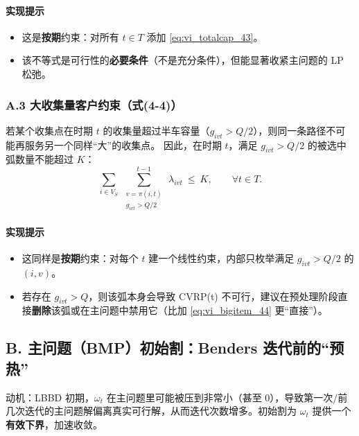\documentclass{article}
\begin{document}
\paragraph{实现提示}
\begin{itemize}[leftmargin=2em]
  \item 这是\textbf{按期}约束：对所有 $t\in T$ 添加 \eqref{eq:vi_totalcap_43}。
  \item 该不等式是可行性的\textbf{必要条件}（不是充分条件），但能显著收紧主问题的 LP 松弛。
\end{itemize}

\subsubsection*{A.3 大收集量客户约束（式(4-4)）}

若某个收集点在时期 $t$ 的收集量超过半车容量（$g_{ivt}>Q/2$），则同一条路径不可能再服务另一个同样“大”的收集点。
因此，在时期 $t$，满足 $g_{ivt}>Q/2$ 的被选中弧数量不能超过 $K$：
\begin{equation}
\sum_{i\in V_S}\ \sum_{\substack{v=\pi(i,t)\\ g_{ivt}>Q/2}}^{t-1}\ \lambda_{ivt}\ \le\ K,\qquad \forall t\in T.
\label{eq:vi_bigitem_44}
\end{equation}

\paragraph{实现提示}
\begin{itemize}[leftmargin=2em]
  \item 这同样是\textbf{按期}约束：对每个 $t$ 建一个线性约束，内部只枚举满足 $g_{ivt}>Q/2$ 的 $(i,v)$。
  \item 若存在 $g_{ivt}>Q$，则该弧本身会导致 CVRP(t) 不可行，建议在预处理阶段直接\textbf{删除}该弧或在主问题中禁用它（比加 \eqref{eq:vi_bigitem_44} 更“直接”）。
\end{itemize}

\subsection{B. 主问题（BMP）初始割：Benders 迭代前的“预热”}

动机：LBBD 初期，$\omega_t$ 在主问题里可能被压到非常小（甚至 0），导致第一次/前几次迭代的主问题解偏离真实可行解，从而迭代次数增多。初始割为 $\omega_t$ 提供一个\textbf{有效下界}，加速收敛。
\end{document}
